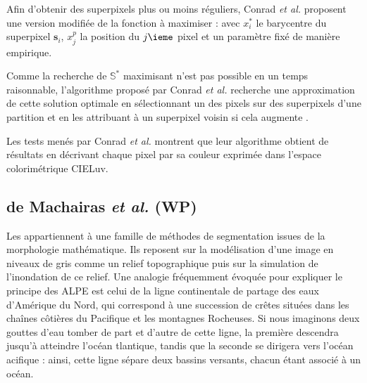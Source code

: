Afin  d'obtenir des superpixels plus ou moins réguliers, Conrad \textit{et al.} proposent une version modifiée de la fonction à maximiser :
avec $x_{i}^{*}$ le barycentre du superpixel $\mathbf{s}_{i}$, $x_{j}^{p}$ la position du $j\ieme$ pixel et  un paramètre fixé de manière empirique.

Comme la recherche de $\mathbb{S}^{*}$ maximisant  n'est pas possible en un temps raisonnable, l'algorithme proposé par Conrad \textit{et al.} \cite{conrad2013contour} recherche une approximation de cette solution optimale en sélectionnant un  des pixels sur  des superpixels  d'une partition et en les attribuant à un superpixel voisin si cela augmente . 

Les tests menés par Conrad \textit{et al.} \cite{conrad2013contour} montrent que leur algorithme obtient de  résultats en décrivant chaque pixel par sa couleur exprimée dans l'espace colorimétrique CIELuv.

\subsection{ de Machairas \textit{et al.} (WP)}
Les  appartiennent à une famille de méthodes de segmentation issues de la morphologie mathématique. Ils reposent sur la modélisation d'une image en niveaux de gris comme un relief topographique puis sur la simulation de l'inondation de ce relief.  Une analogie fréquemment évoquée pour expliquer le principe des ALPE est celui de la ligne continentale de partage des eaux d'Amérique du Nord, qui correspond à une succession de crêtes situées dans les chaînes côtières du Pacifique et les montagnes Rocheuses. Si nous imaginons deux gouttes d'eau tomber de part et d'autre de cette ligne, la première descendra jusqu'à atteindre l'océan tlantique, tandis que la seconde se dirigera vers l'océan acifique : ainsi, cette ligne sépare deux bassins versants, chacun étant associé à un océan. 

